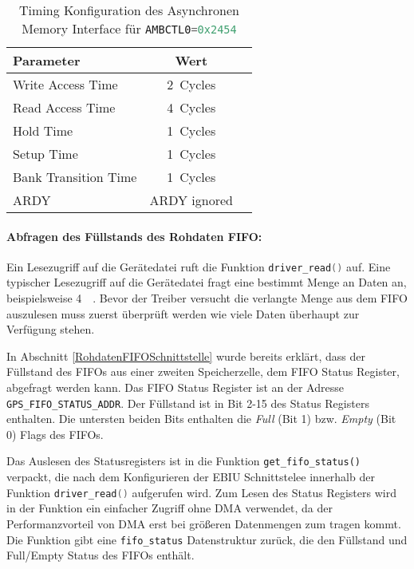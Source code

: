 \begin{table}[htbp]
    \ttabbox
    {
        \caption[EBIU Timing Konfiguration]{Timing Konfiguration des Asynchronen Memory Interface für \lstinline[language=C]$AMBCTL0=0x2454$}
        \label{TabEBIUTimingConfig}
    }
    {
    \begin{tabular}{l c c}
        \toprule
        Parameter               & Wert   \\
        \midrule
        Write Access Time       & \SI{2}{Cycles} \\
        Read Access Time        & \SI{4}{Cycles} \\
        Hold Time               & \SI{1}{Cycles} \\
        Setup Time              & \SI{1}{Cycles} \\
        Bank Transition Time    & \SI{1}{Cycles} \\
        ARDY                    & ARDY ignored \\
        \bottomrule
    \end{tabular}
}
\end{table}


\paragraph{Abfragen des Füllstands des Rohdaten FIFO:}
\label{FuellstandFIFO}
Ein Lesezugriff auf die Gerätedatei ruft die Funktion \lstinline[language=C]$driver_read()$ auf. Eine typischer Lesezugriff auf die Gerätedatei fragt eine bestimmt Menge an Daten an, beispielsweise \SI{4}{\kilo\byte}. Bevor der Treiber versucht die verlangte Menge aus dem FIFO auszulesen muss zuerst überprüft werden wie viele Daten überhaupt zur Verfügung stehen. 

In Abschnitt \ref{RohdatenFIFOSchnittstelle} wurde bereits erklärt, dass der Füllstand des FIFOs aus einer zweiten Speicherzelle, dem FIFO Status Register, abgefragt werden kann. Das FIFO Status Register ist an der Adresse \lstinline$GPS_FIFO_STATUS_ADDR$. Der Füllstand ist in Bit 2-15 des Status Registers enthalten. Die untersten beiden Bits enthalten die \emph{Full} (Bit 1) bzw. \emph{Empty} (Bit 0) Flags des FIFOs.

Das Auslesen des Statusregisters ist in die Funktion \lstinline$get_fifo_status()$ verpackt, die nach dem Konfigurieren der EBIU Schnittstelee innerhalb der Funktion \lstinline[language=C]$driver_read()$ aufgerufen wird. Zum Lesen des Status Registers wird in der Funktion ein einfacher Zugriff ohne DMA verwendet, da der Performanzvorteil von DMA erst bei größeren Datenmengen zum tragen kommt. Die Funktion gibt eine \lstinline$fifo_status$ Datenstruktur zurück, die den Füllstand und Full/Empty Status des FIFOs enthält.  

